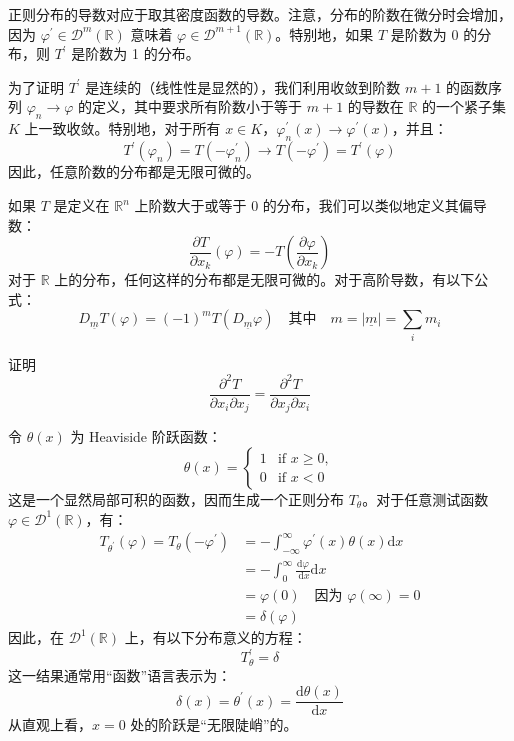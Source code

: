 正则分布的导数对应于取其密度函数的导数。注意，分布的阶数在微分时会增加，因为
$\varphi^{\prime} \in \mathcal{D}^m(\mathbb{R})$ 意味着
$\varphi \in \mathcal{D}^{m+1}(\mathbb{R})$。特别地，如果 $T$
是阶数为 0 的分布，则 $T^{\prime}$ 是阶数为 1 的分布。

为了证明 $T^{\prime}$ 是连续的（线性性是显然的），我们利用收敛到阶数
$m+1$ 的函数序列 $\varphi_n \to \varphi$
的定义，其中要求所有阶数小于等于 $m+1$ 的导数在 $\mathbb{R}$
的一个紧子集 $K$ 上一致收敛。特别地，对于所有
$x \in K$，$\varphi_n^{\prime}(x) \to \varphi^{\prime}(x)$，并且：
 $$
T^{\prime}(\varphi_n) = T\left(-\varphi_n^{\prime}\right) \to T\left(-\varphi^{\prime}\right) = T^{\prime}(\varphi)
$$
因此，任意阶数的分布都是无限可微的。

如果 $T$ 是定义在 $\mathbb{R}^n$ 上阶数大于或等于 0
的分布，我们可以类似地定义其偏导数：
 $$
\frac{\partial T}{\partial x_k}(\varphi) = -T\left(\frac{\partial \varphi}{\partial x_k}\right)
$$
对于 $\mathbb{R}$
上的分布，任何这样的分布都是无限可微的。对于高阶导数，有以下公式：
 $$
D_{\underline{m}} T(\varphi) = (-1)^m T\left(D_{\underline{m}} \varphi\right) \quad \text{其中} \quad m = |\underline{m}| = \sum_{i} m_i
$$
\begin{exercise}
  证明
$$
\frac{\partial^2 T}{\partial x_i \partial x_j} = \frac{\partial^2 T}{\partial x_j \partial x_i}
$$
\end{exercise}

\begin{eg}\label{eg:12.4} 
  令 $\theta(x)$ 为 Heaviside 阶跃函数：
 $$
\theta(x) = 
\begin{cases} 
1 & \text{if } x \geq 0, \\ 
0 & \text{if } x < 0 
\end{cases}
$$
这是一个显然局部可积的函数，因而生成一个正则分布
$T_\theta$。对于任意测试函数
$\varphi \in \mathcal{D}^1(\mathbb{R})$，有：
 $$
\begin{aligned}
T_{\theta^{\prime}}(\varphi) = T_\theta\left(-\varphi^{\prime}\right) & = -\int_{-\infty}^\infty \varphi^{\prime}(x) \theta(x) \mathrm{d}x \\
& = -\int_0^\infty \frac{\mathrm{d}\varphi}{\mathrm{~d}x} \mathrm{d}x \\
& = \varphi(0) \quad \text{因为 } \varphi(\infty) = 0 \\
& = \delta(\varphi)
\end{aligned}
$$
因此，在 $\mathcal{D}^1(\mathbb{R})$ 上，有以下分布意义的方程：
 $$
T_\theta^{\prime} = \delta
$$
这一结果通常用``函数''语言表示为：
 $$
\delta(x) = \theta^{\prime}(x) = \frac{\mathrm{d}\theta(x)}{\mathrm{d}x}
$$
从直观上看，$x=0$ 处的阶跃是``无限陡峭''的。
\end{eg}


